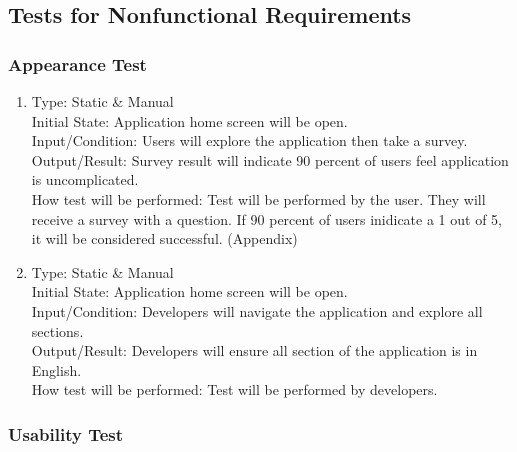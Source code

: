\documentclass[12pt, titlepage]{article}
\begin{document}
\subsection{Tests for Nonfunctional Requirements}

\subsubsection{Appearance Test}

\begin{adjustwidth}{2.2em}{0pt}
\begin{enumerate}[{NF-AT}1.]
    \item Type: Static \& Manual \\
    Initial State: Application home screen will be open.\\
    Input/Condition: Users will explore the application then take a survey.\\
    Output/Result: Survey result will indicate 90 percent of users feel application is uncomplicated. \\
    How test will be performed: Test will be performed by the user. They will receive a survey with a question. If 90 percent of users inidicate a 1 out of 5, it will be considered successful. (Appendix)
    
    \item Type: Static \& Manual\\
    Initial State: Application home screen will be open.\\
    Input/Condition: Developers will navigate the application and explore all sections.\\
    Output/Result: Developers will ensure all section of the application is in English.\\
    How test will be performed: Test will be performed by developers. 
\end{enumerate}
\end{adjustwidth}

\subsubsection{Usability Test}
\end{document}
